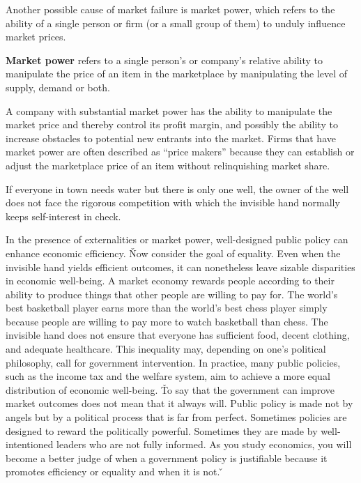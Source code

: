 Another possible cause of market failure is market power, which refers to the ability of a single person or firm (or
a small group of them) to unduly influence market prices.

\textbf{Market power} refers to a single person's or company's relative ability to manipulate the price of an item in
the marketplace by manipulating the level of supply, demand or both.
\ed

A company with substantial market power has the ability to manipulate the market price and thereby control its profit
margin, and possibly the ability to increase obstacles to potential new entrants into the market. Firms that have
market power are often described as ``price makers'' because they can establish or adjust the marketplace price of an
item without relinquishing market share.

\be
If everyone in town needs water but there is only one well, the owner of the well does not face the rigorous
competition with which the invisible hand normally keeps self-interest in check.
\ee

In the presence of externalities or market power, well-designed public policy can enhance economic efficiency. \v

Now consider the goal of equality. Even when the invisible hand yields efficient outcomes, it can nonetheless leave
sizable disparities in economic well-being. A market economy rewards people according to their ability to produce
things that other people are willing to pay for. The world's best basketball player earns more than the world's best
chess player simply because people are willing to pay more to watch basketball than chess. The invisible hand does
not ensure that everyone has sufficient food, decent clothing, and adequate healthcare. This inequality may,
depending on one's political philosophy, call for government intervention. In practice, many public policies, such as
the income tax and the welfare system, aim to achieve a more equal distribution of economic well-being. \v

To say that the government can improve market outcomes does not mean that it always will. Public policy is made not
by angels but by a political process that is far from perfect. Sometimes policies are designed to reward the
politically powerful. Sometimes they are made by well-intentioned leaders who are not fully informed. As you study
economics, you will become a better judge of when a government policy is justifiable because it promotes efficiency
or equality and when it is not. \v

